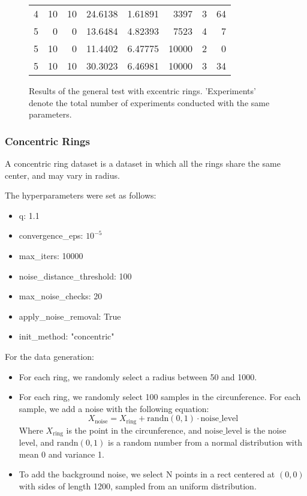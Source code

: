 \documentclass[conference]{IEEEtran}
\begin{document}
\begin{figure*}[!ht]
\begin{tabular}{rrrrrrrr}
                     4 &           10 &                 10 &     24.6138  &    1.61891     &      3397    &             3 &              64       \\
                     5 &            0 &                  0 &     13.6484  &    4.82393     &      7523    &             4 &               7       \\
                     5 &           10 &                  0 &     11.4402  &    6.47775     &     10000    &             2 &               0       \\
                     5 &           10 &                 10 &     30.3023  &    6.46981     &     10000    &             3 &              34       \\
    \hline
    \end{tabular}
\caption{Results of the general test with excentric rings. 'Experiments' denote the total number of experiments conducted with the same parameters.}
\end{figure*}

\subsubsection{Concentric Rings}
A concentric ring dataset is a dataset in which all the rings share the same center, and may vary in radius.

The hyperparameters were set as follows:

\begin{itemize}
    \item q: 1.1
    \item convergence\_eps: $10^{-5}$
    \item max\_iters: 10000
    \item noise\_distance\_threshold: 100
    \item max\_noise\_checks: 20
    \item apply\_noise\_removal: True
    \item init\_method: "concentric"
\end{itemize}

For the data generation:
\begin{itemize}
    \item For each ring, we randomly select a radius between 50 and 1000.
    \item For each ring, we randomly select 100 samples in the circunference. For each sample, we add a noise with the following equation:
    \begin{equation}
        X_{\text{noise}} = X_{\text{ring}} + \text{randn}(0, 1) \cdot \text{noise\_level}
    \end{equation}
    Where $X_{\text{ring}}$ is the point in the circunference, and $\text{noise\_level}$ is the noise level, and $\text{randn}(0, 1)$ is a random number from a normal distribution with mean 0 and variance 1.
    \item To add the background noise, we select N points in a rect centered at $(0, 0)$ with sides of length 1200, sampled from an uniform distribution.
\end{itemize}
\end{document}

